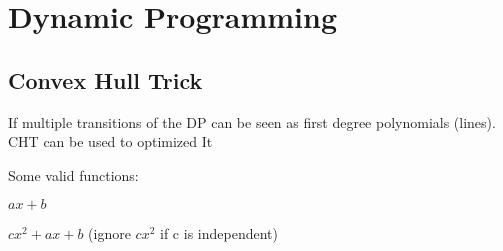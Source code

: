 \chapter{Dynamic Programming}

\section{Convex Hull Trick}

    If multiple transitions of the DP can be seen as 
    first degree polynomials (lines). CHT can be used to optimized It

    Some valid functions:

    $ax + b$
    
    $cx^2 + ax + b$ 
    (ignore $cx^2$ if c is independent)

